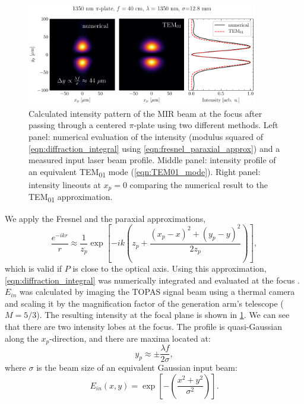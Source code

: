 \begin{figure}
	\centering
	\includegraphics[width=0.9\textwidth]{figures/chap1/pi_plate_focus_LP_TEM_1350nm.pdf}
	\caption{Calculated intensity pattern of the MIR beam at the focus after passing through a centered $\pi$-plate using two different methods. Left panel: numerical evaluation of the intensity (modulus squared of \cref{eqn:diffraction_integral} using \cref{eqn:fresnel_paraxial_approx}) and a measured input laser beam profile. Middle panel: intensity profile of an equivalent TEM\textsubscript{01} mode (\cref{eqn:TEM01_mode}). Right panel: intensity lineouts at $x_p = 0$ comparing the numerical result to the TEM\textsubscript{01} approximation.}
	\label{fig:pi_plate_focus_sim}
\end{figure}

We apply the Fresnel and the paraxial approximations,
\begin{equation}
\frac{e^{-i k r}}{r} \approx \frac{1}{z_p} \exp \left[-ik \left(z_p + \frac{(x_p-x)^2 + (y_p-y)^2}{2z_p} \right) \right],
\label{eqn:fresnel_paraxial_approx}
\end{equation}
which is valid if $P$ is close to the optical axis. Using this approximation, \cref{eqn:diffraction_integral} was numerically integrated and evaluated at the focus \cite{vdovinLightPipesPython}. $E_{in}$ was calculated by imaging the TOPAS signal beam using a thermal camera and scaling it by the magnification factor of the generation arm's telescope (${M=5/3}$). The resulting intensity at the focal plane is shown in \cref{fig:pi_plate_focus_sim}. We can see that there are two intensity lobes at the focus. The profile is quasi-Gaussian along the $x_p$-direction, and there are maxima located at:
\begin{equation}
y_p \approx \pm \frac{\lambda f}{2 \sigma},
\label{eqn:pi-plate-separation}
\end{equation}
where $\sigma$ is the beam size of an equivalent Gaussian input beam:
\begin{equation}
E_{in}(x,y) = \exp \left[ - \left( \frac{x^2+y^2}{\sigma^2} \right) \right].
\label{eqn:gaussian_profile}
\end{equation}

